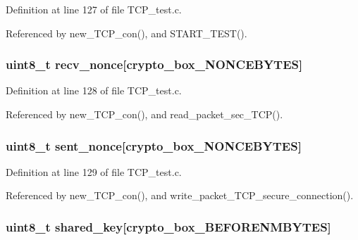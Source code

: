 Definition at line 127 of file T\+C\+P\+\_\+test.\+c.



Referenced by new\+\_\+\+T\+C\+P\+\_\+con(), and S\+T\+A\+R\+T\+\_\+\+T\+E\+S\+T().

\hypertarget{structsec___t_c_p__con_aae0467706f97aa3ef23e5dc9c3c199d7}{
\subsubsection[{recv\+\_\+nonce}]{\setlength{\rightskip}{0pt plus 5cm}uint8\+\_\+t recv\+\_\+nonce\mbox{[}crypto\+\_\+box\+\_\+\+N\+O\+N\+C\+E\+B\+Y\+T\+E\+S\mbox{]}}}\label{structsec___t_c_p__con_aae0467706f97aa3ef23e5dc9c3c199d7}


Definition at line 128 of file T\+C\+P\+\_\+test.\+c.



Referenced by new\+\_\+\+T\+C\+P\+\_\+con(), and read\+\_\+packet\+\_\+sec\+\_\+\+T\+C\+P().

\hypertarget{structsec___t_c_p__con_a9df0e00e8f493ed6cd1ff45e7da33c0d}{
\subsubsection[{sent\+\_\+nonce}]{\setlength{\rightskip}{0pt plus 5cm}uint8\+\_\+t sent\+\_\+nonce\mbox{[}crypto\+\_\+box\+\_\+\+N\+O\+N\+C\+E\+B\+Y\+T\+E\+S\mbox{]}}}\label{structsec___t_c_p__con_a9df0e00e8f493ed6cd1ff45e7da33c0d}


Definition at line 129 of file T\+C\+P\+\_\+test.\+c.



Referenced by new\+\_\+\+T\+C\+P\+\_\+con(), and write\+\_\+packet\+\_\+\+T\+C\+P\+\_\+secure\+\_\+connection().

\hypertarget{structsec___t_c_p__con_a81ead9fac55a0cedc30a96253a2c5119}{
\subsubsection[{shared\+\_\+key}]{\setlength{\rightskip}{0pt plus 5cm}uint8\+\_\+t shared\+\_\+key\mbox{[}crypto\+\_\+box\+\_\+\+B\+E\+F\+O\+R\+E\+N\+M\+B\+Y\+T\+E\+S\mbox{]}}}\label{structsec___t_c_p__con_a81ead9fac55a0cedc30a96253a2c5119}


